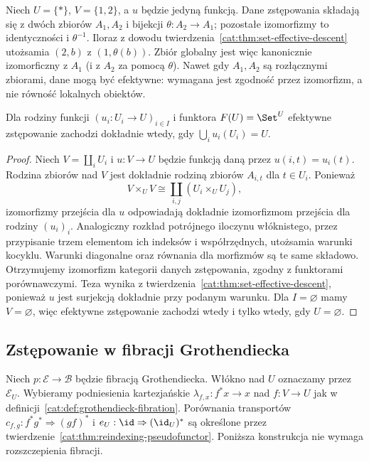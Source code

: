 \begin{przyklad}\label{cat:ex:set-descent-two-copies}
Niech $U=\{*\}$, $V=\{1,2\}$, a $u$ będzie jedyną funkcją. Dane zstępowania składają się z dwóch zbiorów $A_1,A_2$ i bijekcji $\theta:A_2\to A_1$; pozostałe izomorfizmy to identyczności i $\theta^{-1}$. Iloraz z dowodu twierdzenia~\ref{cat:thm:set-effective-descent} utożsamia $(2,b)$ z $(1,\theta(b))$. Zbiór globalny jest więc kanonicznie izomorficzny z $A_1$ (i z $A_2$ za pomocą $\theta$). Nawet gdy $A_1,A_2$ są rozłącznymi zbiorami, dane mogą być efektywne: wymagana jest zgodność przez izomorfizm, a nie równość lokalnych obiektów.
\end{przyklad}

\begin{wniosek}\label{cat:cor:set-family-descent}
Dla rodziny funkcji $(u_i:U_i\to U)_{i\in I}$ i funktora $F(U)=\Set^U$ efektywne zstępowanie zachodzi dokładnie wtedy, gdy $\bigcup_i u_i(U_i)=U$.
\end{wniosek}
\begin{proof}
Niech $V=\coprod_i U_i$ i $u:V\to U$ będzie funkcją daną przez $u(i,t)=u_i(t)$. Rodzina zbiorów nad $V$ jest dokładnie rodziną zbiorów $A_{i,t}$ dla $t\in U_i$. Ponieważ
\[
 V\times_U V\cong\coprod_{i,j}(U_i\times_U U_j),
\]
izomorfizmy przejścia dla $u$ odpowiadają dokładnie izomorfizmom przejścia dla rodziny $(u_i)_i$. Analogiczny rozkład potrójnego iloczynu włóknistego, przez przypisanie trzem elementom ich indeksów i współrzędnych, utożsamia warunki kocyklu. Warunki diagonalne oraz równania dla morfizmów są te same składowo. Otrzymujemy izomorfizm kategorii danych zstępowania, zgodny z funktorami porównawczymi. Teza wynika z twierdzenia~\ref{cat:thm:set-effective-descent}, ponieważ $u$ jest surjekcją dokładnie przy podanym warunku. Dla $I=\varnothing$ mamy $V=\varnothing$, więc efektywne zstępowanie zachodzi wtedy i tylko wtedy, gdy $U=\varnothing$.
\end{proof}

\subsection{Zstępowanie w fibracji Grothendiecka}

Niech $p:\mathcal E\to\mathcal B$ będzie fibracją Grothendiecka. Włókno nad $U$ oznaczamy przez $\mathcal E_U$. Wybieramy podniesienia kartezjańskie $\lambda_{f,x}:f^*x\to x$ nad $f:V\to U$ jak w definicji~\ref{cat:def:grothendieck-fibration}. Porównania transportów $c_{f,g}:f^*g^*\Rightarrow(gf)^*$ i $e_U:\id\Rightarrow(\id_U)^*$ są określone przez twierdzenie~\ref{cat:thm:reindexing-pseudofunctor}. Poniższa konstrukcja nie wymaga rozszczepienia fibracji.


